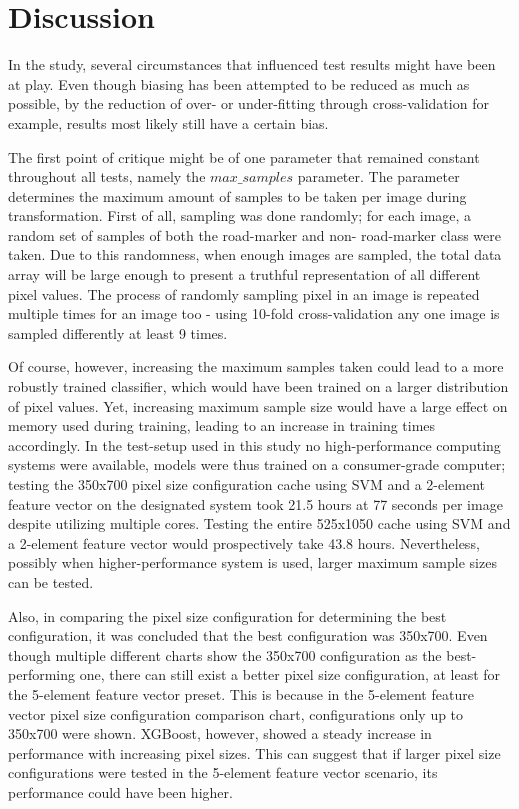 
\section{Discussion}\label{sec:discussion}
In the study, several circumstances that influenced test results might have been at play. Even though biasing has been attempted to be reduced as much as possible, by the reduction of over- or under-fitting through cross-validation for example, results most likely still have a certain bias.

The first point of critique might be of one parameter that remained constant throughout all tests, namely the $max\_samples$ parameter. The parameter determines the maximum amount of samples to be taken per image during transformation. First of all, sampling was done randomly; for each image, a random set of samples of both the road-marker and non- road-marker class were taken. Due to this randomness, when enough images are sampled, the total data array will be large enough to present a truthful representation of all different pixel values. The process of randomly sampling pixel in an image is repeated multiple times for an image too - using 10-fold cross-validation any one image is sampled differently at least 9 times.

Of course, however, increasing the maximum samples taken could lead to a more robustly trained classifier, which would have been trained on a larger distribution of pixel values. Yet, increasing maximum sample size would have a large effect on memory used during training, leading to an increase in training times accordingly. In the test-setup used in this study no high-performance computing systems were available, models were thus trained on a consumer-grade computer; testing the 350x700 pixel size configuration cache using SVM and a 2-element feature vector on the designated system took 21.5 hours at 77 seconds per image despite utilizing multiple cores. Testing the entire 525x1050 cache using SVM and a 2-element feature vector would prospectively take 43.8 hours. Nevertheless, possibly when higher-performance system is used, larger maximum sample sizes can be tested.

Also, in comparing the pixel size configuration for determining the best configuration, it was concluded that the best configuration was 350x700. Even though multiple different charts show the 350x700 configuration as the best-performing one, there can still exist a better pixel size configuration, at least for the 5-element feature vector preset. This is because in the 5-element feature vector pixel size configuration comparison chart, configurations only up to 350x700 were shown. XGBoost, however, showed a steady increase in performance with increasing pixel sizes. This can suggest that if larger pixel size configurations were tested in the 5-element feature vector scenario, its performance could have been higher.

